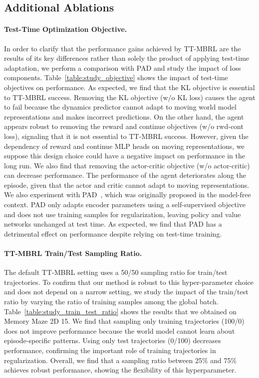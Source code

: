

\subsection{Additional Ablations}

\paragraph{Test-Time Optimization Objective.} In order to clarify that the performance gains achieved by TT-MBRL are the results of its key differences rather than solely the product of applying test-time adaptation, we perform a comparison with PAD and study the impact of loss components. Table~\ref{table:study_objective} shows the impact of test-time objectives on performance. As expected, we find that the KL objective is essential to TT-MBRL success. Removing the KL objective (w/o KL loss) causes the agent to fail because the dynamics predictor cannot adapt to moving world model representations and makes incorrect predictions. On the other hand, the agent appears robust to removing the reward and continue objectives (w/o rwd-cont loss), signaling that it is not essential to TT-MBRL success. However, given the dependency of reward and continue MLP heads on moving representations, we suppose this design choice could have a negative impact on performance in the long run. We also find that removing the actor-critic objective (w/o actor-critic) can decrease performance. The performance of the agent deteriorates along the episode, given that the actor and critic cannot adapt to moving representations. We also experiment with PAD~\citep{hansen2021self}, which was originally proposed in the model-free context. PAD only adapts encoder parameters using a self-supervised objective and does not use training samples for regularization, leaving policy and value networks unchanged at test time. As expected, we find that PAD has a detrimental effect on performance despite relying on test-time training.



\paragraph{TT-MBRL Train/Test Sampling Ratio.} The default TT-MBRL setting uses a 50/50 sampling ratio for train/test trajectories. To confirm that our method is robust to this hyper-parameter choice and does not depend on a narrow setting, we study the impact of the train/test ratio by varying the ratio of training samples among the global batch. Table~\ref{table:study_train_test_ratio} shows the results that we obtained on Memory Maze 2D 15. We find that sampling only training trajectories (100/0) does not improve performance because the world model cannot learn about episode-specific patterns. Using only test trajectories (0/100) decreases performance, confirming the important role of training trajectories in regularization. Overall, we find that a sampling ratio between 25\% and 75\% achieves robust performance, showing the flexibility of this hyperparameter.

